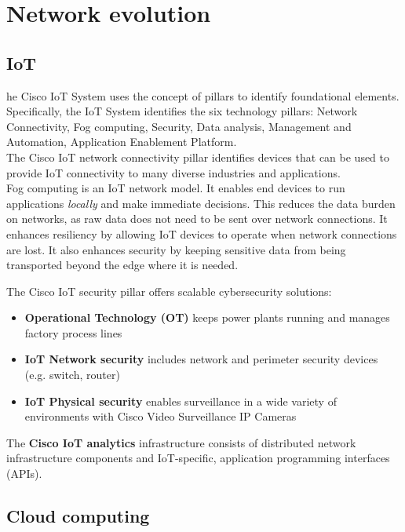 \chapter{Network evolution}

\section{IoT}

he Cisco IoT System uses the concept of pillars to identify foundational elements. Specifically, the IoT System identifies the six technology pillars: Network Connectivity, Fog computing, Security, Data analysis, Management and Automation, Application Enablement Platform.\\

The Cisco IoT network connectivity pillar identifies devices that can be used to provide IoT connectivity to many diverse industries and applications.\\

Fog computing is an IoT network model. It enables end devices to run applications \emph{locally} and make immediate decisions. This reduces the data burden on networks, as raw data does not need to be sent over network connections. It enhances resiliency by allowing IoT devices to operate when network connections are lost. It also enhances security by keeping sensitive data from being transported beyond the edge where it is needed.

The Cisco IoT security pillar offers scalable cybersecurity solutions:

\begin{itemize}
\item \textbf{Operational Technology (OT)} keeps power plants running and manages factory process lines
\item \textbf{IoT Network security} includes network and perimeter security devices (e.g. switch, router)
\item \textbf{IoT Physical security} enables surveillance in a wide variety of environments with Cisco Video Surveillance IP Cameras
\end{itemize}

The \textbf{Cisco IoT analytics} infrastructure consists of distributed network infrastructure components and IoT-specific, application programming interfaces (APIs).

\section{Cloud computing}

